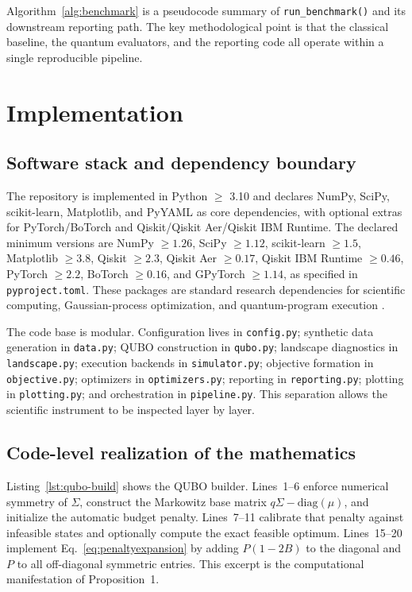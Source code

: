 \documentclass[11pt]{article}
\begin{document}
Algorithm~\ref{alg:benchmark} is a pseudocode summary of \texttt{run\_benchmark()} and its downstream reporting path. The key methodological point is that the classical baseline, the quantum evaluators, and the reporting code all operate within a single reproducible pipeline.

\section{Implementation}\label{sec:implementation}

\subsection{Software stack and dependency boundary}

The repository is implemented in Python \(\geq\) 3.10 and declares NumPy, SciPy, scikit-learn, Matplotlib, and PyYAML as core dependencies, with optional extras for PyTorch/BoTorch and Qiskit/Qiskit Aer/Qiskit IBM Runtime. The declared minimum versions are NumPy \(\geq 1.26\), SciPy \(\geq 1.12\), scikit-learn \(\geq 1.5\), Matplotlib \(\geq 3.8\), Qiskit \(\geq 2.3\), Qiskit Aer \(\geq 0.17\), Qiskit IBM Runtime \(\geq 0.46\), PyTorch \(\geq 2.2\), BoTorch \(\geq 0.16\), and GPyTorch \(\geq 1.14\), as specified in \texttt{pyproject.toml}. These packages are standard research dependencies for scientific computing, Gaussian-process optimization, and quantum-program execution \cite{harris2020numpy,virtanen2020scipy,pedregosa2011sklearn,hunter2007matplotlib,paszke2019pytorch,balandat2020botorch,aleksandrowicz2019qiskit}.

The code base is modular. Configuration lives in \texttt{config.py}; synthetic data generation in \texttt{data.py}; QUBO construction in \texttt{qubo.py}; landscape diagnostics in \texttt{landscape.py}; execution backends in \texttt{simulator.py}; objective formation in \texttt{objective.py}; optimizers in \texttt{optimizers.py}; reporting in \texttt{reporting.py}; plotting in \texttt{plotting.py}; and orchestration in \texttt{pipeline.py}. This separation allows the scientific instrument to be inspected layer by layer.

\subsection{Code-level realization of the mathematics}

Listing~\ref{lst:qubo-build} shows the QUBO builder. Lines~1--6 enforce numerical symmetry of \(\Sigma\), construct the Markowitz base matrix \(q\Sigma-\mathrm{diag}(\mu)\), and initialize the automatic budget penalty. Lines~7--11 calibrate that penalty against infeasible states and optionally compute the exact feasible optimum. Lines~15--20 implement Eq.~\eqref{eq:penaltyexpansion} by adding \(P(1-2B)\) to the diagonal and \(P\) to all off-diagonal symmetric entries. This excerpt is the computational manifestation of Proposition~1.
\end{document}
